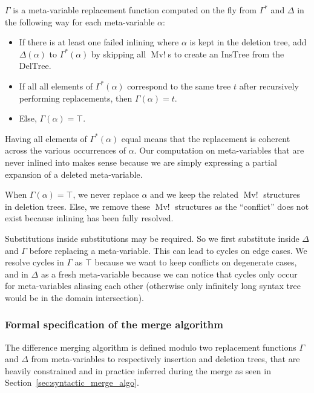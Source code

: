 \documentclass[a4paper,11pt]{article}
\newcommand\typ[1]{\mathrm{#1}}
\DeclareMathOperator\MvConflict{Mv!}
\begin{document}
\begin{enumerate}
 $\Gamma$ is a meta-variable replacement function computed on the fly from
$\Gamma^*$ and $\Delta$ in the following way for each meta-variable $\alpha$:
\begin{itemize}
\item If there is at least one failed inlining where $\alpha$ is kept in
the deletion tree, add $\Delta(\alpha)$ to $\Gamma^*(\alpha)$ by skipping all
$\MvConflict$s to create an $\typ{InsTree}$ from the $\typ{DelTree}$.
\item If all all elements of $\Gamma^*(\alpha)$ correspond to the same tree $t$
after recursively performing replacements, then $\Gamma(\alpha) = t$.
\item Else, $\Gamma(\alpha) = \top$.
\end{itemize}
Having all elements of $\Gamma^*(\alpha)$ equal means that the replacement is
coherent across the various occurrences of $\alpha$. Our computation on
meta-variables that are never inlined into makes sense because we are simply
expressing a partial expansion of a deleted meta-variable.

 When $\Gamma(\alpha) = \top$, we never replace $\alpha$ and we keep the
related
$\MvConflict$ structures in deletion trees. Else, we remove these $\MvConflict$
structures as the ``conflict'' does not exist because inlining has been fully
resolved.

 Substitutions inside substitutions may be required. So we first substitute
inside $\Delta$ and $\Gamma$ before replacing a meta-variable. This can lead to
cycles on edge cases. We resolve cycles in $\Gamma$ as $\top$ because we want to
keep conflicts on degenerate cases, and in $\Delta$ as a fresh meta-variable
because we can notice that cycles only occur for meta-variables aliasing each
other (otherwise only infinitely long syntax tree would be in the domain
intersection).
\end{enumerate}

\subsubsection{Formal specification of the merge algorithm}
The difference merging algorithm is defined modulo two replacement
functions $\Gamma$ and $\Delta$ from meta-variables to respectively
insertion and deletion trees, that are heavily constrained and in
practice inferred during the merge as seen in
Section~\ref{sec:syntactic_merge_algo}.
\end{document}
